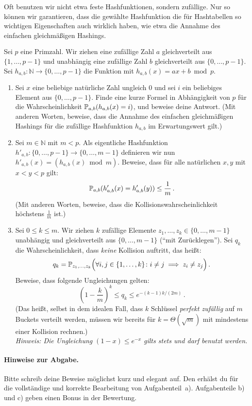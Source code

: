 \documentclass{uebung_cs}
\begin{document}
Oft benutzen wir nicht etwa feste Hashfunktionen, sondern zufällige.
Nur so können wir garantieren, dass die gewählte Hashfunktion die für Hashtabellen so wichtigen Eigenschaften auch wirklich haben, wie etwa die Annahme des einfachen gleichmäßigen Hashings.

Sei $p$ eine Primzahl.
Wir ziehen eine zufällige Zahl $a$ gleichverteilt aus $\{1,\dots,p-1\}$ und unabhängig eine zufällige Zahl $b$ gleichverteilt aus $\{0,\dots,p-1\}$.
Sei $h_{a,b}\colon\mathbb N\to\{0,\dots,p-1\}$ die Funktion mit $h_{a,b}(x)=ax+b\bmod p$.

\begin{enumerate}
    \item Sei $x$ eine beliebige natürliche Zahl ungleich $0$ und sei $i$ ein beliebiges Element aus $\{0,\dots,p-1\}$.
    Finde eine kurze Formel in Abhängigkeit von $p$ für die Wahrscheinlichkeit $\mathbb P_{a,b}(h_{a,b}(x)=i)$, und beweise deine Antwort. (Mit anderen Worten, beweise, dass die Annahme des einfachen gleichmäßigen Hashings für die zufällige Hashfunktion $h_{a,b}$ im Erwartungswert gilt.)
    \item Sei $m\in\mathbb N$ mit $m<p$.
    Als eigentliche Hashfunktion $h'_{a,b}\colon\{0,\dots,p-1\}\to\{0,\dots,m-1\}$ definieren wir nun $h'_{a,b}(x)=(h_{a,b}(x) \bmod m)$.
    Beweise, dass für alle natürlichen $x,y$ mit $x<y<p$ gilt:
    \[\mathbb P_{a,b}(h'_{a,b}(x)=h'_{a,b}(y))\le\frac{1}{m}\,.\]
    (Mit anderen Worten, beweise, dass die Kollisionswahrscheinlichkeit höchstens $\frac{1}{m}$ ist.)
    \item Sei $0\le k\le m$. Wir ziehen $k$ zufällige Elemente $z_1,\dots,z_k\in \{0,\dots,m-1\}$ unabhängig und gleichverteilt aus $\{0,\dots,m-1\}$ (``mit Zurücklegen''). Sei $q_k$ die Wahrscheinlichkeit, dass \emph{keine} Kollision auftritt, das heißt:
    \[q_k=\mathbb P_{z_1,\dots,z_k}\Big(\forall i,j\in \{1,\dots,k\}\colon i\ne j \implies z_i\ne z_j\Big)\,.\]
    Beweise, dass folgende Ungleichungen gelten:
    \[
        \left(1-\frac{k}{m}\right)^k\le q_k \leq e^{-(k-1)k/(2m)}\,.
    \]
    (Das heißt, selbst in dem idealen Fall, dass $k$ Schlüssel \emph{perfekt zufällig} auf $m$ Buckets verteilt werden, müssen wir bereits für $k=\Theta(\sqrt{m})$ mit mindestens einer Kollision rechnen.)\\
    \emph{Hinweis: Die Ungleichung $(1-x)\le e^{-x}$ gilts stets und darf benutzt werden.}
\end{enumerate}

\paragraph*{Hinweise zur Abgabe.}
Bitte schreib deine Beweise möglichst kurz und elegant auf.
Den  erhälst du für die vollständige und korrekte Bearbeitung von Aufgabenteil~a). Aufgabenteile b) und c) geben einen Bonus in der Bewertung.
\end{document}
